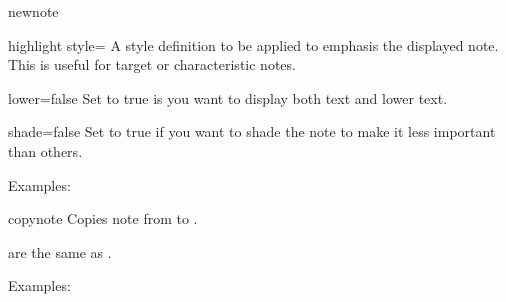 \documentclass[a4paper]{article}
\begin{document}
\begin{docCommand}{newnote}{}
  \begin{docKey}{highlight style}{=}{}
    A style definition to be applied to emphasis the displayed note. This is
    useful for target or characteristic notes.
  \end{docKey}

  \begin{docKey}{lower}{=}{false}
    Set to true is you want to display both text and lower text.
  \end{docKey}

  \begin{docKey}{shade}{=}{false}
    Set to true if you want to shade the note to make it less important than
    others.
  \end{docKey}

  Examples:
  \begin{example}
  \end{example}

  \begin{example}
  \end{example}  
\end{docCommand}


\begin{docCommand}{copynote}{}
  Copies note from  to .

   are the same as .

  Examples:
  \begin{example}
  \end{example}
  
  \begin{example}
  \end{example}

\end{docCommand}
\end{document}
